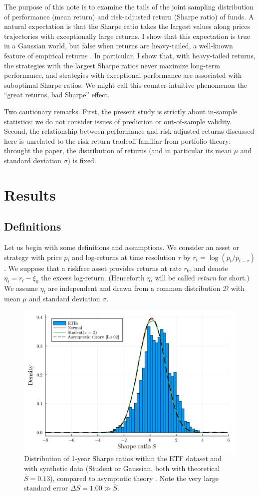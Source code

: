 \documentclass[
reprint,
amsmath,amssymb,
aps,
]{revtex4-2}
\begin{document}
The purpose of this note is to examine the tails of the joint sampling distribution of performance (mean return) and risk-adjusted return (Sharpe ratio) of funds.
A natural expectation is that the Sharpe ratio takes the largest values along prices trajectories with exceptionally large returns.
I show that this expectation is true in a Gaussian world, but false when returns are heavy-tailed, a well-known feature of empirical returns \cite{bouchaudTheory2003}. 
In particular, I show that, with heavy-tailed returns, the strategies with the largest Sharpe ratios never maximize long-term performance, and strategies with exceptional performance are associated with suboptimal Sharpe ratios. 
We might call this counter-intuitive phenomenon the ``great returns, bad Sharpe'' effect. 

Two cautionary remarks. 
First, the present study is strictly about in-sample statistics: we do not consider issues of prediction or out-of-sample validity.  
Second, the relationship between performance and risk-adjusted returns discussed here is unrelated to the risk-return tradeoff familiar from portfolio theory: throught the paper, the distribution of returns (and in particular its mean $\mu$ and standard deviation $\sigma$) is fixed. 

\section{Results}

\subsection{Definitions}

Let us begin with some definitions and assumptions.
We consider an asset or strategy with price $p_t$ and log-returns at time resolution $\tau$ by $r_t = \log(p_t/p_{t-\tau})$.
We suppose that a riskfree asset provides returns at rate $r_0$, and denote $\eta_t = r_t - \xi_0$ the excess log-return. 
(Henceforth $\eta_t$ will be called \emph{return} for short.)
We assume $\eta_t$ are independent and drawn from a common distribution $\mathcal{D}$ with mean $\mu$ and standard deviation $\sigma$. 

\begin{figure}[t!]
    \includegraphics[width = .45\textwidth]{../plots/sharpe-dist.png}
    \caption{
        Distribution of 1-year Sharpe ratios within the ETF dataset and with synthetic data (Student or Gaussian, both with theoretical $\overline{S} = 0.13$), compared to asymptotic theory \cite{loStatistics2002}. 
        Note the very large standard error $\Delta S = 1.00 \gg \overline{S}$.
        }
    \label{sharpe-dist}
\end{figure}
\end{document}
